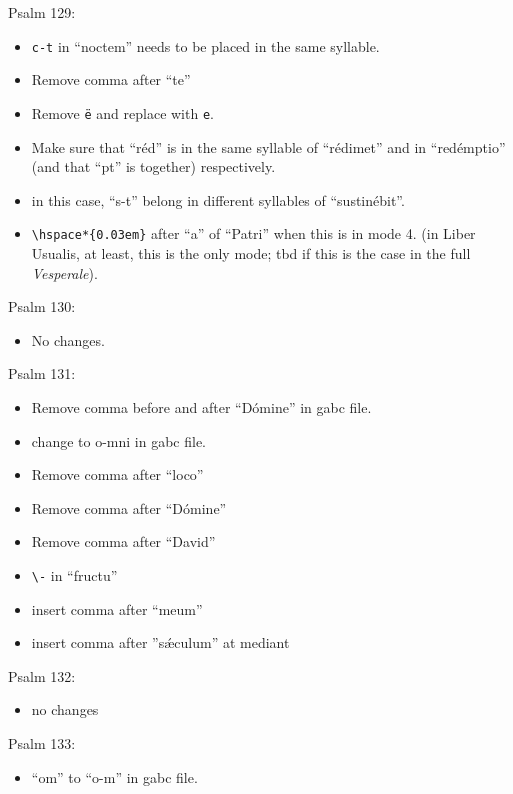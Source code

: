 \documentclass[11pt]{article}
\begin{document}
  Psalm 129:
  \begin{itemize}
  \item  \texttt{c-t} in ``noctem'' needs to be placed in the same syllable.
    \item Remove comma after ``te''
  \item Remove \texttt{ë} and replace with \texttt{e}.
    \item Make sure that ``réd'' is in the same syllable of ``rédimet'' and in ``redémptio'' (and that ``pt'' is together) respectively.
   \item in this case, ``s-t'' belong in different syllables of ``sustinébit''.
    \item \verb|\hspace*{0.03em}| after ``a'' of ``Patri'' when this is in mode 4. (in Liber Usualis, at least, this is the only mode; tbd if this is the case in the full \textit{Vesperale}).
 
  \end{itemize}
  
  Psalm 130:
  \begin{itemize}
  \item 
No changes.
    \end{itemize}
  
      Psalm 131:
  \begin{itemize}
  \item Remove comma before and after ``Dómine'' in gabc file.
  \item
 change to o-mni  in gabc file.
  \item   Remove comma after ``loco''
  \item
  Remove comma after ``Dómine''
    \item
  Remove comma after ``David''
  \item
 \verb|\-| in ``fructu''
 \item insert comma after ``meum''
 \item insert comma after ''sǽculum'' at mediant
    \end{itemize}

Psalm 132:
  \begin{itemize}
  \item 
no changes
    \end{itemize}

 Psalm 133:
  \begin{itemize}
  \item 
``om'' to ``o-m'' in gabc file.
    \end{itemize}
\end{document}
